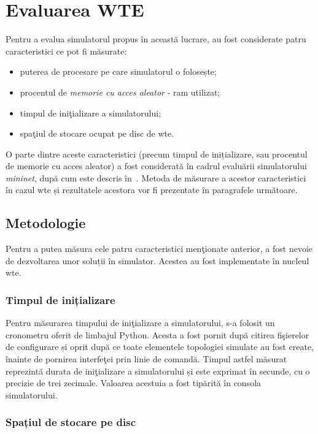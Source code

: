 \section{Evaluarea WTE}

Pentru a evalua simulatorul propus în această lucrare, au fost considerate patru caracteristici ce pot fi măsurate: 
\begin{itemize}
	\item puterea de procesare pe care simulatorul o folosește;
	\item procentul de \textit{memorie cu acces aleator} - \gls{ram} utilizat;
	\item timpul de iniţializare a simulatorului;
	\item spaţiul de stocare ocupat pe disc de \gls{wte}.
\end{itemize}

O parte dintre aceste caracteristici (precum timpul de inițializare, sau procentul de memorie cu acces aleator) a fost considerată în cadrul evaluării simulatorului \textit{mininet}, după cum este descris în~\cite{lantz2010network}. Metoda de măsurare a acestor caracteristici în cazul \gls{wte} și rezultatele acestora vor fi prezentate în paragrafele următoare.

\subsection{Metodologie}

Pentru a putea măsura cele patru caracteristici menţionate anterior, a fost nevoie de dezvoltarea unor soluții în simulator. Acestea au fost implementate în nucleul \gls{wte}.

\subsubsection{Timpul de inițializare}

Pentru măsurarea timpului de iniţializare a simulatorului, s-a folosit un cronometru oferit de limbajul Python. Acesta a fost pornit după citirea fişierelor de configurare și oprit după ce toate elementele topologiei simulate au fost create, înainte de pornirea interfeţei prin linie de comandă. Timpul astfel măsurat reprezintă durata de iniţializare a simulatorului și este exprimat în secunde, cu o precizie de trei zecimale. Valoarea acestuia a fost tipărită în consola simulatorului.

\subsubsection{Spațiul de stocare pe disc}

